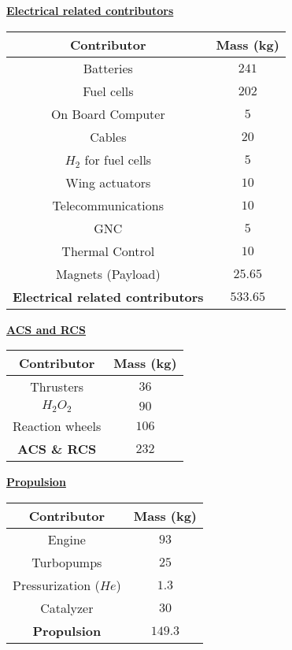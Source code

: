 \textbf{\underline{Electrical related contributors}}
\begin{center}
\begin{tabular}[H]{|c|c|}
	\hline
	\cellcolor{gray!50}Contributor & \cellcolor{gray!50}Mass (kg)\\
	\hline
	Batteries & $241$\\
	\hline
	Fuel cells & $202$\\
	\hline
	On Board Computer & $5$\\
	\hline
	Cables & $20$\\
	\hline
	$H_2$ for fuel cells & $5$\\
	\hline
	Wing actuators & $10$\\
	\hline
	Telecommunications & $10$\\
	\hline
	GNC & $5$\\
	\hline
	Thermal Control & $10$\\
	\hline
	Magnets (Payload) & $25.65$\\
	\hline
	\cellcolor{green!30}\textbf{Electrical related contributors} & \textbf{$533.65$}\\
	\hline
\end{tabular}
\end{center}

\textbf{\underline{ACS and RCS}}
\begin{center}
\begin{tabular}[H]{|c|c|}
	\hline
	\cellcolor{gray!50}Contributor & \cellcolor{gray!50}Mass (kg)\\
	\hline
	Thrusters & $36$\\
	\hline
	$H_2O_2$ & $90$\\
	\hline
	Reaction wheels & $106$\\
	\hline
	\cellcolor{green!30}\textbf{ACS \& RCS} & \textbf{$232$}\\
	\hline
\end{tabular}
\end{center}

\textbf{\underline{Propulsion}}
\begin{center}
\begin{tabular}[H]{|c|c|}
	\hline
	\cellcolor{gray!50}Contributor & \cellcolor{gray!50}Mass (kg)\\
	\hline
	Engine & $93$\\
	\hline
	Turbopumps & $25$\\
	\hline
	Pressurization ($He$) & $1.3$\\
	\hline
	Catalyzer & $30$\\
	\hline
	\cellcolor{green!30}\textbf{Propulsion} & \textbf{$149.3$}\\
	\hline
\end{tabular}
\end{center}

